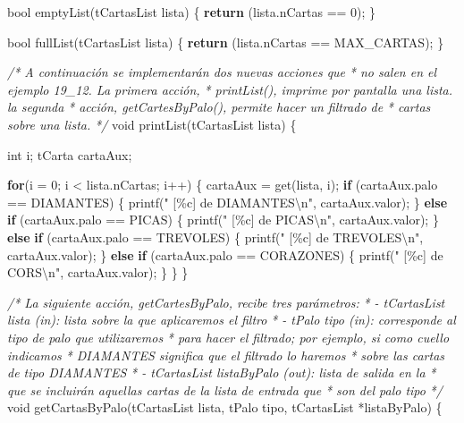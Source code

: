 \documentclass[
]{book}
\newenvironment{Shaded}{\begin{snugshade}}{\end{snugshade}}
\newcommand{\CommentTok}[1]{\textcolor[rgb]{0.56,0.35,0.01}{\textit{#1}}}
\newcommand{\ControlFlowTok}[1]{\textcolor[rgb]{0.13,0.29,0.53}{\textbf{#1}}}
\newcommand{\DataTypeTok}[1]{\textcolor[rgb]{0.13,0.29,0.53}{#1}}
\newcommand{\DecValTok}[1]{\textcolor[rgb]{0.00,0.00,0.81}{#1}}
\newcommand{\NormalTok}[1]{#1}
\newcommand{\SpecialCharTok}[1]{\textcolor[rgb]{0.00,0.00,0.00}{#1}}
\newcommand{\StringTok}[1]{\textcolor[rgb]{0.31,0.60,0.02}{#1}}
\begin{document}
\begin{Shaded}
\begin{Highlighting}[]
\DataTypeTok{bool}\NormalTok{ emptyList(tCartasList lista) \{}
    \ControlFlowTok{return}\NormalTok{ (lista.nCartas == }\DecValTok{0}\NormalTok{);}
\NormalTok{\}}

\DataTypeTok{bool}\NormalTok{ fullList(tCartasList lista) \{}
    \ControlFlowTok{return}\NormalTok{ (lista.nCartas == MAX\_CARTAS);}
\NormalTok{\}}

\CommentTok{/* A continuación se implementarán dos nuevas acciones que}
\CommentTok{ * no salen en el ejemplo 19\_12. La primera acción,}
\CommentTok{ * printList(), imprime por pantalla una lista. la segunda}
\CommentTok{ * acción, getCartesByPalo(), permite hacer un filtrado de}
\CommentTok{ * cartas sobre una lista.}
\CommentTok{ */}
\DataTypeTok{void}\NormalTok{ printList(tCartasList lista) \{}

    \DataTypeTok{int}\NormalTok{ i;}
\NormalTok{    tCarta cartaAux;}

    \ControlFlowTok{for}\NormalTok{(i = }\DecValTok{0}\NormalTok{; i \textless{} lista.nCartas; i++) \{ }
\NormalTok{        cartaAux = get(lista, i);}
        \ControlFlowTok{if}\NormalTok{ (cartaAux.palo == DIAMANTES) \{}
\NormalTok{            printf(}\StringTok{" [\%c] de DIAMANTES}\SpecialCharTok{\textbackslash{}n}\StringTok{"}\NormalTok{, cartaAux.valor);}
\NormalTok{        \} }\ControlFlowTok{else} \ControlFlowTok{if}\NormalTok{ (cartaAux.palo == PICAS) \{}
\NormalTok{            printf(}\StringTok{" [\%c] de PICAS}\SpecialCharTok{\textbackslash{}n}\StringTok{"}\NormalTok{, cartaAux.valor);}
\NormalTok{        \} }\ControlFlowTok{else} \ControlFlowTok{if}\NormalTok{ (cartaAux.palo == TREVOLES) \{}
\NormalTok{            printf(}\StringTok{" [\%c] de TREVOLES}\SpecialCharTok{\textbackslash{}n}\StringTok{"}\NormalTok{, cartaAux.valor);}
\NormalTok{        \} }\ControlFlowTok{else} \ControlFlowTok{if}\NormalTok{ (cartaAux.palo == CORAZONES) \{}
\NormalTok{            printf(}\StringTok{" [\%c] de CORS}\SpecialCharTok{\textbackslash{}n}\StringTok{"}\NormalTok{, cartaAux.valor);}
\NormalTok{        \}}
\NormalTok{    \}}
\NormalTok{\}}

\CommentTok{/* La siguiente acción, getCartesByPalo, recibe tres parámetros:}
\CommentTok{ * {-} tCartasList lista (in): lista sobre la que aplicaremos el filtro}
\CommentTok{ * {-} tPalo tipo (in): corresponde al tipo de palo que utilizaremos }
\CommentTok{ *   para hacer el filtrado; por ejemplo, si como cuello indicamos}
\CommentTok{ *   DIAMANTES significa que el filtrado lo haremos}
\CommentTok{ *   sobre las cartas de tipo DIAMANTES}
\CommentTok{ * {-} tCartasList listaByPalo (out): lista de salida en la }
\CommentTok{ *   que se incluirán aquellas cartas de la lista de entrada que }
\CommentTok{ *   son del palo tipo}
\CommentTok{ */}
\DataTypeTok{void}\NormalTok{ getCartasByPalo(tCartasList lista, tPalo tipo, tCartasList *listaByPalo) \{}


\end{Highlighting}
\end{Shaded}
\end{document}
